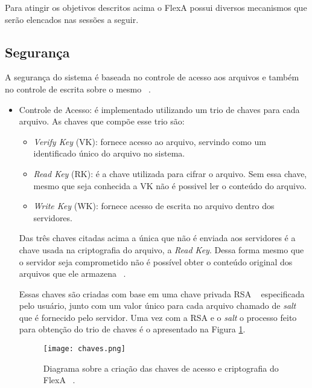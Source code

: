 	 Para atingir os objetivos descritos acima o FlexA possui diversos mecanismos que serão elencados nas sessões a seguir.
	 
	 \subsection{Segurança}
	    A segurança do sistema é baseada no controle de acesso aos arquivos e também no controle de escrita sobre o mesmo ~\cite{silas}.
	 
    	 \begin{itemize}
    	 
    	    \item Controle de Acesso: é implementado utilizando um trio de chaves para cada arquivo. As chaves que compõe esse trio são:
        	    \begin{itemize}
        	        \item \textit{Verify Key} (VK): fornece acesso ao arquivo, servindo como um identificado único do arquivo no sistema.
        	        \item \textit{Read Key} (RK): é a chave utilizada para cifrar o arquivo. Sem essa chave, mesmo que seja conhecida a VK não é possivel ler o conteúdo do arquivo.
        	        
        	        \item \textit{Write Key} (WK): fornece acesso de escrita no arquivo dentro dos servidores.
        	    \end{itemize}
        	    
            Das três chaves citadas acima a única que não é enviada aos servidores é a chave usada na criptografia do arquivo, a \textit{Read Key}. Dessa forma mesmo que o servidor seja comprometido não é possível obter o conteúdo original dos arquivos que ele armazena ~\cite{mario}.
        	    
        	    
        	    Essas chaves são criadas com base em uma chave privada RSA ~\cite{shamirRSA} especificada pelo usuário, junto com um valor único para cada arquivo chamado de \textit{salt} que é fornecido pelo servidor. Uma vez com a RSA e o \textit{\textit{salt}} o processo feito para obtenção do trio de chaves é o apresentado na Figura \ref{fig:chavesFlexa}.
        	    
        	    \begin{figure}
        	    \centering
        	    \texttt{[image: chaves.png]}
        	    \caption{Diagrama sobre a criação das chaves de acesso e criptografia do FlexA ~\cite{mario}.}
        	    \label{fig:chavesFlexa}
        	    \end{figure}
        	    

\end{itemize}
